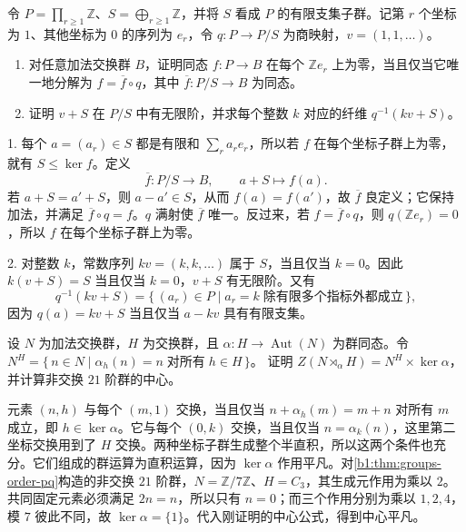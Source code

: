 \begin{exercise}\label{b1:ex:06-infinite-product-maps}
	令 \(P=\prod_{r\geq1}\mathbb Z\)、\(S=\bigoplus_{r\geq1}\mathbb Z\)，并将 \(S\) 看成 \(P\) 的有限支集子群。记第 \(r\) 个坐标为 \(1\)、其他坐标为 \(0\) 的序列为 \(e_r\)，令 \(q:P\rightarrow P/S\) 为商映射，\(v=(1,1,\ldots)\)。
	\begin{enumerate}
		\item 对任意加法交换群 \(B\)，证明同态 \(f:P\rightarrow B\) 在每个 \(\mathbb Z e_r\) 上为零，当且仅当它唯一地分解为 \(f=\overline f\circ q\)，其中 \(\overline f:P/S\rightarrow B\) 为同态。
		\item 证明 \(v+S\) 在 \(P/S\) 中有无限阶，并求每个整数 \(k\) 对应的纤维 \(q^{-1}(kv+S)\)。
	\end{enumerate}
\end{exercise}
\begin{solution}
	1. 每个 \(a=(a_r)\in S\) 都是有限和 \(\sum_r a_re_r\)，所以若 \(f\) 在每个坐标子群上为零，就有 \(S\leq\ker f\)。定义
	\[
		\overline f:P/S\longrightarrow B,\qquad a+S\longmapsto f(a).
	\]
	若 \(a+S=a'+S\)，则 \(a-a'\in S\)，从而 \(f(a)=f(a')\)，故 \(\overline f\) 良定义；它保持加法，并满足 \(\overline f\circ q=f\)。\(q\) 满射使 \(\overline f\) 唯一。反过来，若 \(f=\overline f\circ q\)，则 \(q(\mathbb Z e_r)=0\)，所以 \(f\) 在每个坐标子群上为零。

	2. 对整数 \(k\)，常数序列 \(kv=(k,k,\ldots)\) 属于 \(S\)，当且仅当 \(k=0\)。因此 \(k(v+S)=S\) 当且仅当 \(k=0\)，\(v+S\) 有无限阶。又有
	\[
		q^{-1}(kv+S) =\{\,(a_r)\in P\mid a_r=k\;\text{除有限多个指标外都成立}\,\},
	\]
	因为 \(q(a)=kv+S\) 当且仅当 \(a-kv\) 具有有限支集。
\end{solution}

\begin{exercise}\label{b1:ex:06-3}
	设 \(N\) 为加法交换群，\(H\) 为交换群，且 \(\alpha:H\rightarrow\operatorname{Aut}(N)\) 为群同态。令 \(N^H=\bigl\{\,n\in N\mid\alpha_h(n)=n\;\text{对所有}\;h\in H\,\bigr\}\)。 证明 \(Z(N\rtimes_\alpha H)=N^H\times\ker\alpha\)，并计算非交换 \(21\) 阶群的中心。
\end{exercise}
\begin{solution}
	元素 \((n,h)\) 与每个 \((m,1)\) 交换，当且仅当 \(n+\alpha_h(m)=m+n\) 对所有 \(m\) 成立，即 \(h\in\ker\alpha\)。它与每个 \((0,k)\) 交换，当且仅当 \(n=\alpha_k(n)\)，这里第二坐标交换用到了 \(H\) 交换。两种坐标子群生成整个半直积，所以这两个条件也充分。它们组成的群运算为直积运算，因为 \(\ker\alpha\) 作用平凡。对\cref{b1:thm:groups-order-pq}构造的非交换 \(21\) 阶群，\(N=\mathbb Z/7\mathbb Z\)、\(H=C_3\)，其生成元作用为乘以 \(2\)。共同固定元素必须满足 \(2n=n\)，所以只有 \(n=0\)；而三个作用分别为乘以 \(1,2,4\)，模 \(7\) 彼此不同，故 \(\ker\alpha=\{1\}\)。代入刚证明的中心公式，得到中心平凡。
\end{solution}


